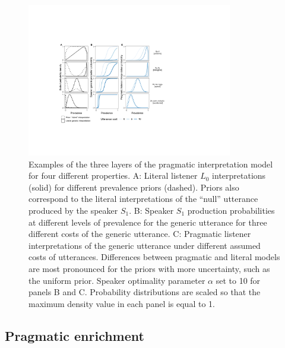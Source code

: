 \documentclass[floatsintext,doc]{apa6}
\begin{document}
\begin{figure}
\centering
\includegraphics[width=0.8\textwidth]{figs/tripartite.pdf}
\vspace{0.5cm}
\caption{Examples of the three layers of the pragmatic interpretation model for four different properties. A: Literal listener $L_0$ interpretations (solid) for different prevalence priors (dashed). Priors also correspond to the literal interpretations of the ``null'' utterance produced by the speaker $S_1$. B: Speaker $S_1$ production probabilities at different levels of prevalence for the generic utterance for three different costs of the generic utterance. C: Pragmatic listener interpretations of the generic utterance under different assumed costs of utterances. Differences between pragmatic and literal models are most pronounced for the priors with more uncertainty, such as the uniform prior. Speaker optimality parameter $\alpha$ set to 10 for panels B and C. Probability distributions are scaled so that the maximum density value in each panel is equal to 1. }
\label{fig:tripartite}
\end{figure}


\hypertarget{pragmatic-enrichment}{%
\subsection{Pragmatic enrichment}\label{pragmatic-enrichment}}
\end{document}
